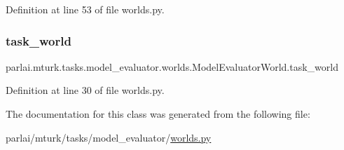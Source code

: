 Definition at line 53 of file worlds.\+py.

\mbox{\label{classparlai_1_1mturk_1_1tasks_1_1model__evaluator_1_1worlds_1_1ModelEvaluatorWorld_ad6bfdd83c43e1eb139f67bdf3816f939}} 
\subsubsection{\texorpdfstring{task\+\_\+world}{task\_world}}
{\footnotesize\ttfamily parlai.\+mturk.\+tasks.\+model\+\_\+evaluator.\+worlds.\+Model\+Evaluator\+World.\+task\+\_\+world}



Definition at line 30 of file worlds.\+py.



The documentation for this class was generated from the following file\+:\begin{DoxyCompactItemize}
\item 
parlai/mturk/tasks/model\+\_\+evaluator/\hyperlink{parlai_2mturk_2tasks_2model__evaluator_2worlds_8py}{worlds.\+py}\end{DoxyCompactItemize}

